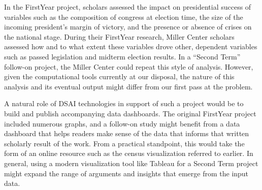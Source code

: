 \documentclass[12pt, oneside]{article}   	%
\begin{document}
In the FirstYear project, scholars assessed the impact on presidential success of variables such as the composition of congress at election time, the size of the incoming president’s margin of victory, and the presence or absence of crises on the national stage.  During their FirstYear research, Miller Center scholars assessed how and to what extent these variables drove other, dependent variables such as passed legislation and midterm election results.  In a “Second Term” follow-on project, the Miller Center could repeat this style of analysis.  However, given the computational tools currently at our disposal, the nature of this analysis and its eventual output might differ from our first pass at the problem.

A natural role of DSAI technologies in support of such a project would be to build and publish accompanying data dashboards.  The original FirstYear project included numerous graphs, and a follow-on study might benefit from a data dashboard that helps readers make sense of the data that informs that written scholarly result of the work.   From a practical standpoint, this would take the form of an online resource such as the census visualization referred to earlier.  In general, using a modern visualization tool like Tableau for a Second Term project might expand the range of arguments and insights that emerge from the input data.


\pagebreak


\end{document}
